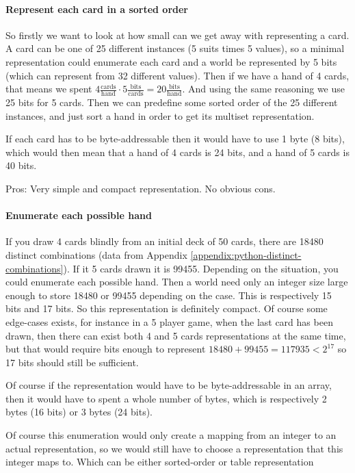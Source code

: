 \paragraph{Represent each card in a sorted order}
So firstly we want to look at how small can we get away with representing a card.
A card can be one of 25 different instances (5 suits times 5 values), so a minimal representation could enumerate each card and a world be represented by 5 bits (which can represent from 32 different values).
Then if we have a hand of 4 cards, that means we spent $4 \frac{\text{cards}}{\text{hand}} \cdot 5 \frac{\text{bits}}{\text{cards}} = 20 \frac{\text{bits}}{\text{hand}}$.
And using the same reasoning we use 25 bits for 5 cards.
Then we can predefine some sorted order of the 25 different instances, and just sort a hand in order to get its multiset representation.

If each card has to be byte-addressable then it would have to use 1 byte (8 bits), which would then mean that a hand of 4 cards is 24 bits, and a hand of 5 cards is 40 bits.

Pros: Very simple and compact representation.
No obvious cons.

\paragraph{Enumerate each possible hand}
If you draw 4 cards blindly from an initial deck of 50 cards, there are 18480 distinct combinations (data from Appendix \ref{appendix:python-distinct-combinations}). If it 5 cards drawn it is 99455. 
Depending on the situation, you could enumerate each possible hand.
Then a world need only an integer size large enough to store 18480 or 99455 depending on the case.
This is respectively 15 bits and 17 bits.
So this representation is definitely compact.
Of course some edge-cases exists, for instance in a 5 player game, when the last card has been drawn, then there can exist both 4 and 5 cards representations at the same time, but that would require bits enough to represent $18480+99455 = 117935 < 2^{17}$ so 17 bits should still be sufficient.

Of course if the representation would have to be byte-addressable in an array, then it would have to spent a whole number of bytes, which is respectively 2 bytes (16 bits) or 3 bytes (24 bits).

Of course this enumeration would only create a mapping from an integer to an actual representation, so we would still have to choose a representation that this integer maps to.
Which can be either sorted-order or table representation


